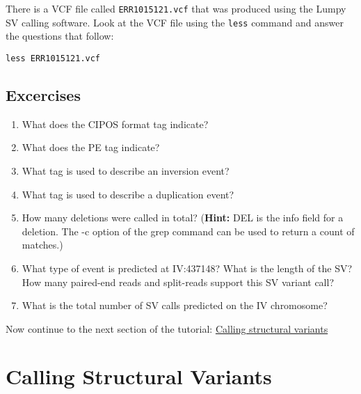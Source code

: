 \documentclass[11pt]{article}
\makeatletter
\providecommand{\tightlist}{%
      \setlength{\itemsep}{0pt}\setlength{\parskip}{0pt}}
\newcommand{\boxspacing}{\kern\kvtcb@left@rule\kern\kvtcb@boxsep}
\newcommand{\prompt}[4]{
        {\ttfamily\llap{{\color{#2}[#3]:\hspace{3pt}#4}}\vspace{-\baselineskip}}
    }
\makeatother
\begin{document}
    There is a VCF file called \texttt{ERR1015121.vcf} that was produced
using the Lumpy SV calling software. Look at the VCF file using the
\texttt{less} command and answer the questions that follow:

    \begin{tcolorbox}[breakable, size=fbox, boxrule=1pt, pad at break*=1mm,colback=cellbackground, colframe=cellborder]
\prompt{In}{incolor}{ }{\boxspacing}
\begin{Verbatim}[commandchars=\\\{\}]
less ERR1015121.vcf
\end{Verbatim}
\end{tcolorbox}

    \hypertarget{excercises}{%
\subsection{Excercises}\label{excercises}}

\begin{enumerate}
\def\labelenumi{\arabic{enumi}.}
\tightlist
\item
  What does the CIPOS format tag indicate?
\item
  What does the PE tag indicate?
\item
  What tag is used to describe an inversion event?
\item
  What tag is used to describe a duplication event?
\item
  How many deletions were called in total? (\textbf{Hint:} DEL is the
  info field for a deletion. The -c option of the grep command can be
  used to return a count of matches.)
\item
  What type of event is predicted at IV:437148? What is the length of
  the SV? How many paired-end reads and split-reads support this SV
  variant call?
\item
  What is the total number of SV calls predicted on the IV chromosome?
\end{enumerate}

    Now continue to the next section of the tutorial:
\href{sv-calling.ipynb}{Calling structural variants}





\newpage





    \hypertarget{calling-structural-variants}{%
\section{Calling Structural
Variants}\label{calling-structural-variants}}
\end{document}
